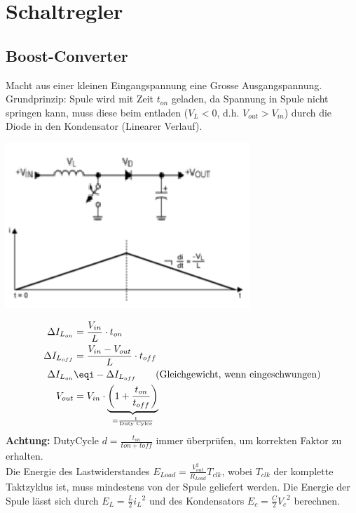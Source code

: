 \section{Schaltregler}
\subsection{Boost-Converter}
Macht aus einer kleinen Eingangspannung eine Grosse Ausgangspannung. Grundprinzip: Spule wird mit Zeit $t_{on}$ geladen, da Spannung in Spule nicht springen kann, muss diese beim entladen ($V_L < 0$, d.h. $V_{out} > V_{in}$) durch die Diode in den Kondensator (Linearer Verlauf).
\begin{center}
	\includegraphics[width=0.6\linewidth]{Images/boost}
\end{center}
\begin{align*}
	\Delta I_{L_{on}} &= \frac{V_{in}}{L}\cdot t_{on} \\
	\Delta I_{L_{off}} &= \frac{V_{in} - V_{out}}{L}\cdot t_{off} \\
	\Delta I_{L_{on}} &\eqi - \Delta I_{L_{off}} \qquad \text{(Gleichgewicht, wenn eingeschwungen)} \\
	V_{out} &= V_{in} \cdot \underbrace{\left(1 + \frac{t_{on}}{t_{off}}\right)}_{=\frac{1}{\text{Duty Cylce}}}
\end{align*}
\textbf{Achtung:} DutyCycle $d = \frac{t_{on}}{t{on} + t{off}}$ immer überprüfen, um korrekten Faktor zu erhalten.\\
Die Energie des Lastwiderstandes $E_{Load} = \frac{V_{out}^2}{R_{Load}}T_{clk}$, wobei $T_{clk}$ der komplette Taktzyklus ist, muss mindestens von der Spule geliefert werden. Die Energie der Spule lässt sich durch $E_L = \frac{L}{2} {i_L}^2$ und des Kondensators $E_c = \frac{C}{2}{V_c}^2$ berechnen.

